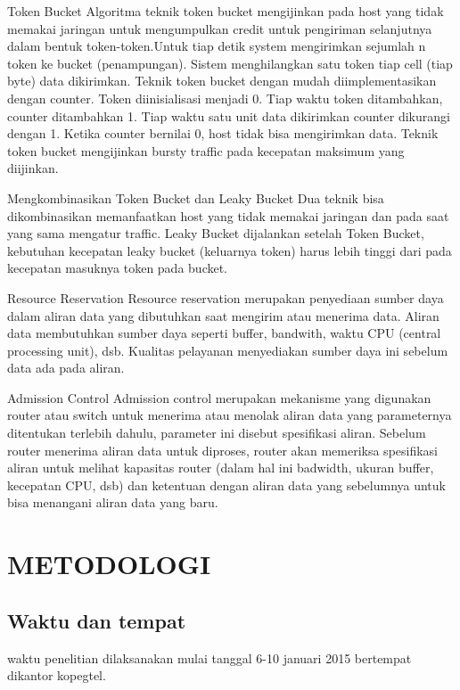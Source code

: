 \documentclass{jtetiproposalskripsi}
\begin{document}
Token Bucket
Algoritma teknik token bucket mengijinkan pada host yang tidak memakai jaringan untuk mengumpulkan credit untuk pengiriman selanjutnya dalam bentuk token-token.Untuk tiap detik system mengirimkan sejumlah n token ke bucket (penampungan). Sistem menghilangkan satu token tiap cell (tiap byte) data dikirimkan. Teknik token bucket dengan mudah diimplementasikan dengan counter. Token diinisialisasi menjadi 0. Tiap waktu token ditambahkan, counter ditambahkan 1. Tiap waktu satu unit data dikirimkan counter dikurangi dengan 1. Ketika counter bernilai 0, host tidak bisa mengirimkan data. Teknik token bucket mengijinkan bursty traffic pada kecepatan maksimum yang diijinkan.

Mengkombinasikan Token Bucket dan Leaky Bucket
Dua teknik bisa dikombinasikan memanfaatkan host yang tidak memakai jaringan dan pada saat yang sama mengatur traffic. Leaky Bucket dijalankan setelah Token Bucket, kebutuhan kecepatan leaky bucket (keluarnya token) harus lebih tinggi dari pada kecepatan masuknya token pada bucket. 

Resource Reservation
Resource reservation merupakan penyediaan sumber daya dalam aliran data yang dibutuhkan saat mengirim atau menerima data. Aliran data membutuhkan sumber daya seperti buffer, bandwith, waktu CPU (central processing unit), dsb. Kualitas pelayanan menyediakan sumber daya ini sebelum data ada pada aliran.

Admission Control
Admission control merupakan mekanisme yang digunakan router atau switch untuk menerima atau menolak aliran data yang parameternya ditentukan terlebih dahulu, parameter ini disebut spesifikasi aliran. Sebelum router menerima aliran data untuk diproses, router akan memeriksa spesifikasi aliran untuk melihat kapasitas router (dalam hal ini badwidth, ukuran buffer, kecepatan CPU, dsb) dan ketentuan dengan aliran data yang sebelumnya untuk bisa menangani aliran data yang baru. 

\begin{figure}[ht!]
  \centering
\end{figure}

\chapter{METODOLOGI}

\section{Waktu dan tempat}
waktu penelitian dilaksanakan mulai tanggal 6-10 januari 2015 bertempat dikantor kopegtel.
\end{document}
